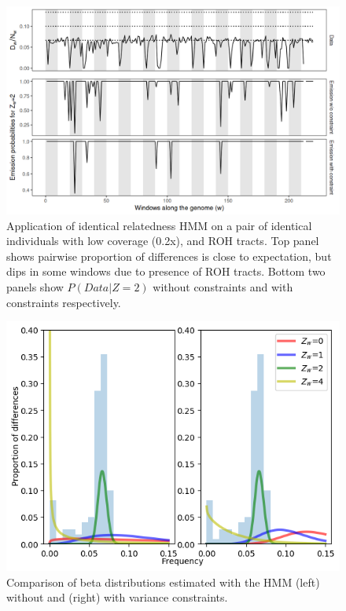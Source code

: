 \documentclass[12pt, letterpaper]{article}
\begin{document}
\begin{figure}[h!]
    \includegraphics[width=18cm]{supplementary_info/plots/contam0_inbred1_run57_coverage0.2_asc0_inputMode_hapProbs_fil0_pair0_15_relid_emissions_bnds.png}
    \centering
    \caption{Application of identical relatedness HMM on a pair of identical individuals with low coverage (0.2x), and ROH tracts. Top panel shows pairwise proportion of differences is close to expectation, but dips in some windows due to presence of ROH tracts. Bottom two panels show $P(Data|Z=2)$ without constraints and with constraints respectively.}
    \label{figS3:bnds}
\end{figure}



\begin{figure}[h!]
    \includegraphics[width=18cm]{supplementary_info/plots/contam0_inbred1_run57_coverage0.2_asc0_inputMode_hapProbs_fil0_pair0_15_relid_betaplot.png}
    \centering
    \caption{Comparison of beta distributions estimated with the HMM (left) without and (right) with variance constraints.}
    \label{figS4:bndsbeta}
\end{figure}
\end{document}
